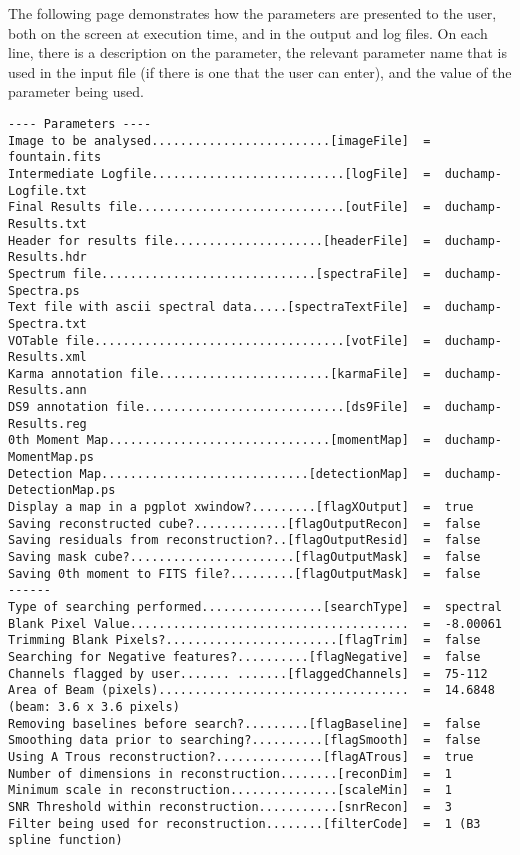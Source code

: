 The following page demonstrates how the parameters are presented to
the user, both on the screen at execution time, and in the output and
log files. On each line, there is a description on the parameter, the
relevant parameter name that is used in the input file (if there is
one that the user can enter), and the value of the parameter being
used.

\newpage
{\scriptsize
\begin{verbatim}
---- Parameters ----
Image to be analysed.........................[imageFile]  =  fountain.fits
Intermediate Logfile...........................[logFile]  =  duchamp-Logfile.txt
Final Results file.............................[outFile]  =  duchamp-Results.txt
Header for results file.....................[headerFile]  =  duchamp-Results.hdr
Spectrum file..............................[spectraFile]  =  duchamp-Spectra.ps
Text file with ascii spectral data.....[spectraTextFile]  =  duchamp-Spectra.txt
VOTable file...................................[votFile]  =  duchamp-Results.xml
Karma annotation file........................[karmaFile]  =  duchamp-Results.ann
DS9 annotation file............................[ds9File]  =  duchamp-Results.reg
0th Moment Map...............................[momentMap]  =  duchamp-MomentMap.ps
Detection Map.............................[detectionMap]  =  duchamp-DetectionMap.ps
Display a map in a pgplot xwindow?.........[flagXOutput]  =  true
Saving reconstructed cube?.............[flagOutputRecon]  =  false
Saving residuals from reconstruction?..[flagOutputResid]  =  false
Saving mask cube?.......................[flagOutputMask]  =  false
Saving 0th moment to FITS file?.........[flagOutputMask]  =  false
------
Type of searching performed.................[searchType]  =  spectral
Blank Pixel Value.......................................  =  -8.00061
Trimming Blank Pixels?........................[flagTrim]  =  false
Searching for Negative features?..........[flagNegative]  =  false
Channels flagged by user....... .......[flaggedChannels]  =  75-112
Area of Beam (pixels)...................................  =  14.6848   (beam: 3.6 x 3.6 pixels)
Removing baselines before search?.........[flagBaseline]  =  false
Smoothing data prior to searching?..........[flagSmooth]  =  false
Using A Trous reconstruction?...............[flagATrous]  =  true
Number of dimensions in reconstruction........[reconDim]  =  1
Minimum scale in reconstruction...............[scaleMin]  =  1
SNR Threshold within reconstruction...........[snrRecon]  =  3
Filter being used for reconstruction........[filterCode]  =  1 (B3 spline function)

\end{verbatim}}
